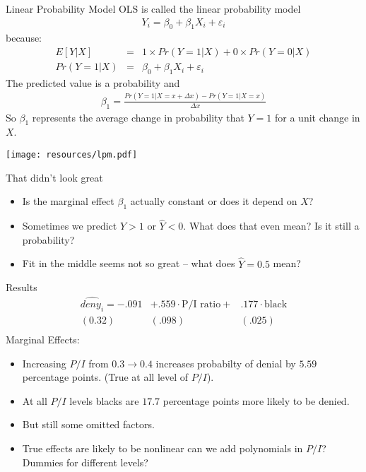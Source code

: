 \documentclass[aspectratio=169]{beamer}
\begin{document}
\begin{frame}{Linear Probability Model}
OLS is called the \alert{linear probability model} 
\begin{eqnarray*}
Y_i  = \beta_0 + \beta_1 X_i + \varepsilon_i 
\end{eqnarray*}
because:
\begin{eqnarray*}
E[Y | X] &=& 1 \times Pr(Y=1 | X) + 0 \times Pr(Y=0  | X) \\
Pr(Y=1 | X) &=& \beta_0 + \beta_1 X_i + \varepsilon_i
\end{eqnarray*}
The predicted value is a \alert{probability} and 
\begin{eqnarray*}
\beta_1 = \frac{Pr(Y=1 | X =x+\Delta x) - Pr(Y=1 | X=x)}{\Delta x}
\end{eqnarray*}
So $\beta_1$ represents the average change in probability that $Y=1$ for a unit change in $X$.
\end{frame}


\begin{frame}
\begin{center}
\texttt{[image: resources/lpm.pdf]}\\
\end{center}
\end{frame}

\begin{frame}{That didn't look great}
\begin{itemize}
\item Is the marginal effect $\beta_1$ actually constant or does it depend on $X$?
\item Sometimes we predict $\hat{Y} >1$ or $\hat{Y} <0$. What does that even mean? Is it still a probability?
\item Fit in the middle seems not so great -- what does $\hat{Y} = 0.5$ mean?
\end{itemize}
\end{frame}

\begin{frame}{Results}
\begin{eqnarray*}
\widehat{deny_i}= -.091& + .559 \cdot \text{P/I ratio} + &.177 \cdot \text{black} \\
(0.32)&( .098) & (.025)\\
\end{eqnarray*}
Marginal Effects: 
\begin{itemize}
\item Increasing $P/I$ from $0.3 \rightarrow 0.4$ increases probabilty of denial by $5.59$ percentage points. (True at all level of $P/I$).
\item At all $P/I$ levels blacks are $17.7$ percentage points more likely to be denied.
\item But still some omitted factors.
\item True effects are likely to be \alert{nonlinear} can we add polynomials in $P/I$? Dummies for different levels? 
\end{itemize}
\end{frame}
\end{document}
